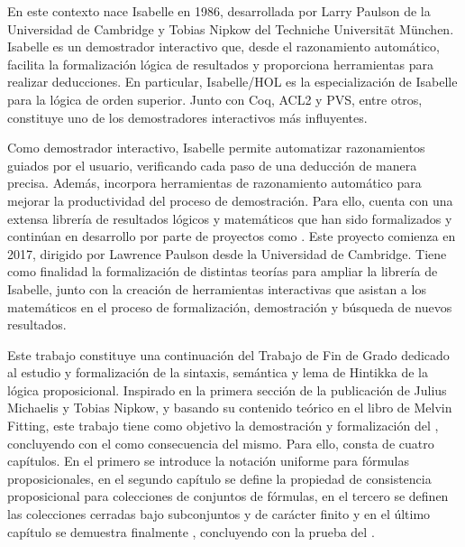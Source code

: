 \begin{isabellebody}
\begin{isamarkuptext}
  En este contexto nace Isabelle en 1986, desarrollada por Larry Paulson 
  de la Universidad de Cambridge y Tobias Nipkow del Techniche 
  Universität München. Isabelle es un demostrador interactivo que,
  desde el razonamiento automático, facilita la formalización lógica de 
  resultados y proporciona herramientas para realizar deducciones. En 
  particular, Isabelle/HOL es la especialización de Isabelle para la 
  lógica de orden superior. Junto con Coq, ACL2 y PVS, entre
  otros, constituye uno de los demostradores interactivos más 
  influyentes.

  Como demostrador interactivo, Isabelle permite automatizar 
  razonamientos guiados por el usuario, verificando cada paso de una 
  deducción de manera precisa. Además, incorpora herramientas de 
  razonamiento automático para mejorar la productividad del proceso de 
  demostración. Para ello, cuenta con una extensa librería de resultados 
  lógicos y matemáticos que han sido formalizados y continúan en 
  desarrollo por parte de proyectos como . Este proyecto 
  comienza en 2017, dirigido por Lawrence Paulson desde la Universidad 
  de Cambridge. Tiene como finalidad la formalización de distintas 
  teorías para ampliar la librería de Isabelle, junto con la creación de 
  herramientas interactivas que asistan a los matemáticos en el proceso 
  de formalización, demostración y búsqueda de nuevos resultados. 

  Este trabajo constituye una continuación del Trabajo de Fin de Grado
    dedicado al estudio
  y formalización de la sintaxis, semántica y lema de Hintikka de la lógica
  proposicional. Inspirado en la primera sección de la publicación 
    de Julius Michaelis y Tobias Nipkow, y
  basando su contenido teórico en el libro   de Melvin Fitting, este trabajo tiene como objetivo la
  demostración y formalización del , concluyendo
  con el  como consecuencia del mismo. Para ello, consta
  de cuatro capítulos. En el primero se introduce la notación uniforme para 
  fórmulas proposicionales, en el segundo capítulo se define la propiedad de 
  consistencia proposicional para colecciones de conjuntos de fórmulas, en el 
  tercero se definen las colecciones cerradas bajo subconjuntos y de carácter 
  finito y en el último capítulo se demuestra finalmente , concluyendo con la prueba del .


\end{isamarkuptext}
\end{isabellebody}
